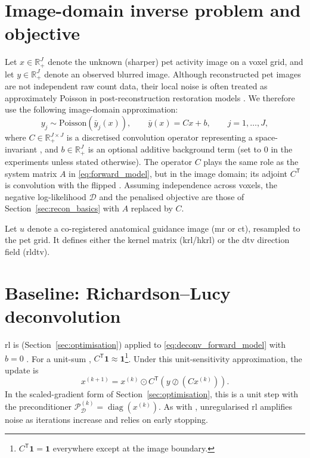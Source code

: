 \section{Image-domain inverse problem and objective}
\label{sec:deconv_model}

Let $x\in\mathbb{R}^J_+$ denote the unknown (sharper) \gls{pet} activity image on a voxel grid, and let $y\in\mathbb{R}^J_+$ denote an observed blurred image. Although reconstructed \gls{pet} images are not independent raw count data, their local noise is often treated as approximately Poisson in post-reconstruction restoration models \cite{sawatzkyEMTVMethodsInverse2013}. We therefore use the following image-domain approximation:
\begin{equation}
    y_j \sim \mathrm{Poisson}(\bar y_j(x)),
    \qquad
    \bar y(x)=Cx+b,
    \qquad j=1,\dots,J,
    \label{eq:deconv_forward_model}
\end{equation}
where $C\in\mathbb{R}_+^{J\times J}$ is a discretised convolution operator representing a space-invariant , and $b\in\mathbb{R}^J_+$ is an optional additive background term (set to $0$ in the experiments unless stated otherwise). The operator $C$ plays the same role as the system matrix $A$ in \eqref{eq:forward_model}, but in the image domain; its adjoint $C^{\mathsf T}$ is convolution with the flipped . Assuming independence across voxels, the negative log-likelihood $\mathcal D$ and the penalised objective are those of Section~\ref{sec:recon_basics} with $A$ replaced by $C$.

Let $u$ denote a co-registered anatomical guidance image (\gls{mr} or \gls{ct}), resampled to the \gls{pet} grid. It defines either the kernel matrix (\gls{krl}/\gls{hkrl}) or the \gls{dtv} direction field (\gls{rldtv}).

\section{Baseline: Richardson--Lucy deconvolution}
\label{sec:deconv_rl}

\gls{rl} is  (Section~\ref{sec:optimisation}) applied to \eqref{eq:deconv_forward_model} with $b=0$ \cite{richardson_bayesian-based_1972,lucy_iterative_1974,sheppMaximumLikelihoodReconstruction1982,sawatzkyEMTVMethodsInverse2013}. For a unit-sum , $C^{\mathsf T}\mathbf{1}\approx\mathbf{1}$\footnote{$C^{\mathsf T}\mathbf{1}=\mathbf{1}$ everywhere except at the image boundary.}. Under this unit-sensitivity approximation, the update is
\begin{equation}
    x^{(k+1)}
    =
    x^{(k)} \odot
        C^{\mathsf T}\!\left( y \oslash (C x^{(k)}) \right).
    \label{eq:rl_update}
\end{equation}
In the scaled-gradient form of Section~\ref{sec:optimisation}, this is a unit step with the  preconditioner $\mathcal{P}_{\mathcal D}^{(k)}=\operatorname{diag}(x^{(k)})$. As with , unregularised \gls{rl} amplifies noise as iterations increase and relies on early stopping.


